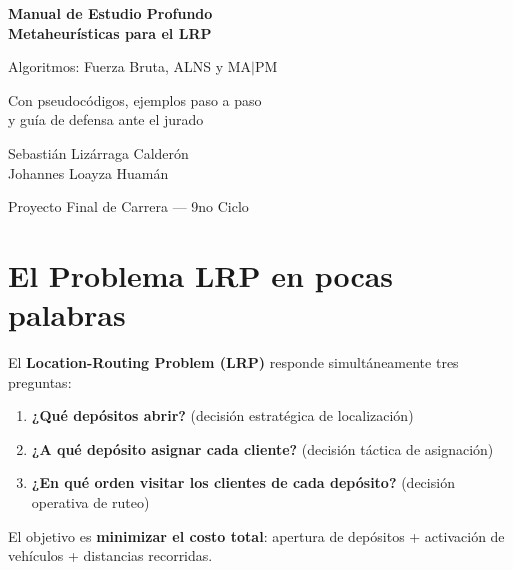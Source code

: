 \documentclass[12pt,a4paper]{article}
\begin{document}
\begin{titlepage}
\centering
\vspace*{2cm}
{\Huge\bfseries Manual de Estudio Profundo\\[0.4em]
Metaheurísticas para el LRP\par}
\vspace{1cm}
{\Large Algoritmos: Fuerza Bruta, ALNS y MA$|$PM\par}
\vspace{0.5cm}
{\large Con pseudocódigos, ejemplos paso a paso\\y guía de defensa ante el jurado\par}
\vspace{2cm}
{\large Sebastián Lizárraga Calderón\\Johannes Loayza Huamán\par}
\vfill
{\large Proyecto Final de Carrera --- 9no Ciclo\par}
\end{titlepage}

\tableofcontents
\newpage

\section{El Problema LRP en pocas palabras}

\begin{definicion}
El \textbf{Location-Routing Problem (LRP)} responde simultáneamente tres preguntas:
\begin{enumerate}
\item \textbf{¿Qué depósitos abrir?} (decisión estratégica de localización)
\item \textbf{¿A qué depósito asignar cada cliente?} (decisión táctica de asignación)
\item \textbf{¿En qué orden visitar los clientes de cada depósito?} (decisión operativa de ruteo)
\end{enumerate}
El objetivo es \textbf{minimizar el costo total}: apertura de depósitos + activación de vehículos + distancias recorridas.
\end{definicion}
\end{document}
